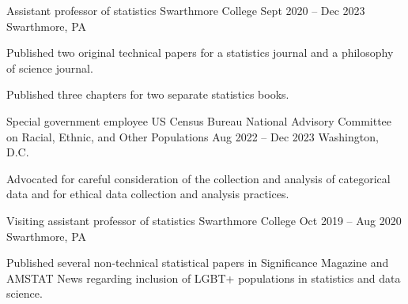 \documentclass[letterpaper]{resume_config}
\begin{document}
\WorkExperience
    {Assistant professor of statistics} %
    {Swarthmore College} %
    {Sept 2020 -- Dec 2023} %
    {Swarthmore, PA} %
    {
        \item Published two original technical papers for a statistics journal and a philosophy of science journal. 
        \item Published three chapters for two separate statistics books. %
       
    } 

\WorkExperience
    {Special government employee} %
    {US Census Bureau National Advisory Committee on Racial, Ethnic, and Other Populations} %
    {Aug 2022 -- Dec 2023} %
    {Washington, D.C.} %
    {
        \item Advocated for careful consideration of the collection and analysis of categorical data and for ethical data collection and analysis practices. 
    } 


\WorkExperience
    {Visiting assistant professor of statistics} %
    {Swarthmore College} %
    {Oct 2019 -- Aug 2020} %
    {Swarthmore, PA} %
    {
        \item Published several non-technical statistical papers in Significance Magazine and AMSTAT News regarding inclusion of LGBT+ populations in statistics and data science.
    } 
\end{document}

